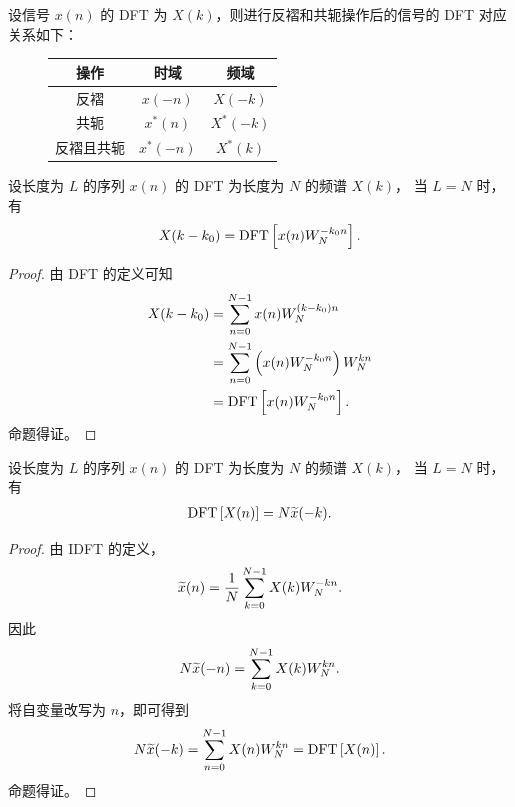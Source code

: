 \begin{property}
    设信号 $x(n)$ 的 DFT 为 $X(k)$，则进行反褶和共轭操作后的信号的 DFT 对应关系如下：
    \begin{figure}[H]
        \begin{tabular}
            {c||c|c}
            操作 & 时域 & 频域 \\
            \hline
            反褶 & $x(-n)$ & $X(-k)$ \\
            共轭 & $x^*(n)$ & $X^*(-k)$ \\
            反褶且共轭 & $x^*(-n)$ & $X^*(k)$ \\
        \end{tabular}
    \end{figure}
\end{property}

\begin{property}
    设长度为 $L$ 的序列 $x(n)$ 的 DFT 为长度为 $N$ 的频谱 $X(k)$，
    当 $L = N$ 时，有
    \begin{align*}
        X(k - k_0) = \mathrm{DFT}\left[x(n)W_N^{-k_0n}\right].
    \end{align*}
\end{property}

\begin{proof}
    由 DFT 的定义可知
    \begin{align*}
        X(k - k_0) & = \sum_{n = 0}^{N - 1}x(n)W_N^{(k - k_0)n} \\
        & = \sum_{n = 0}^{N - 1}\left(x(n)W_N^{-k_0n}\right)W_N^{kn} \\
        & = \mathrm{DFT}\left[x(n)W_N^{-k_0n}\right].
    \end{align*}
    命题得证。
\end{proof}

\begin{property}
    设长度为 $L$ 的序列 $x(n)$ 的 DFT 为长度为 $N$ 的频谱 $X(k)$，
    当 $L = N$ 时，有
    \begin{align*}
        \mathrm{DFT}\left[X(n)\right] = N\widetilde{x}(-k).
    \end{align*}
\end{property}

\begin{proof}
    由 IDFT 的定义，
    \begin{align*}
        \widetilde{x}(n) = \frac{1}{N}\sum_{k = 0}^{N - 1}X(k)W_N^{-kn}.
    \end{align*}
    因此
    \begin{align*}
        N\widetilde{x}(-n) = \sum_{k = 0}^{N - 1}X(k)W_N^{kn}.
    \end{align*}
    将自变量改写为 $n$，即可得到
    \begin{align*}
        N\widetilde{x}(-k) = \sum_{n = 0}^{N - 1}X(n)W_N^{kn} = \mathrm{DFT}\left[X(n)\right].
    \end{align*}
    命题得证。
\end{proof}

